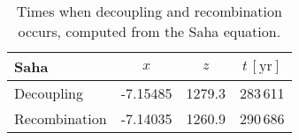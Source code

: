 \begin{table}[ht]
\centering
\caption{Times when decoupling and recombination occurs, computed from the Saha equation.}
\label{tab:M2:results:rec_and_dec_time_table_Saha}
\begin{tabular}{l|ccc}
\toprule
         Saha &      $x$ &    $z$ & $t\,\mathrm{[yr]}$ \\
\midrule
   Decoupling & -7.15485 & 1279.3 &           283\,611 \\
Recombination & -7.14035 & 1260.9 &           290\,686 \\
\bottomrule
\end{tabular}
\end{table}

